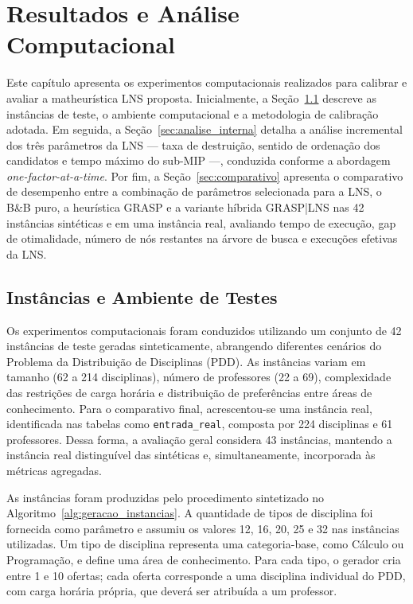 \chapter{Resultados e Análise Computacional} \label{ch:resultados}

Este capítulo apresenta os experimentos computacionais realizados para calibrar e avaliar a matheurística LNS proposta. Inicialmente, a Seção~\ref{sec:instancias} descreve as instâncias de teste, o ambiente computacional e a metodologia de calibração adotada. Em seguida, a Seção~\ref{sec:analise_interna} detalha a análise incremental dos três parâmetros da LNS --- taxa de destruição, sentido de ordenação dos candidatos e tempo máximo do sub-MIP ---, conduzida conforme a abordagem \emph{one-factor-at-a-time}. Por fim, a Seção~\ref{sec:comparativo} apresenta o comparativo de desempenho entre a combinação de parâmetros selecionada para a LNS, o B\&B puro, a heurística GRASP e a variante híbrida GRASP|LNS nas 42 instâncias sintéticas e em uma instância real, avaliando tempo de execução, gap de otimalidade, número de nós restantes na árvore de busca e execuções efetivas da LNS.

\section{Instâncias e Ambiente de Testes} \label{sec:instancias}

Os experimentos computacionais foram conduzidos utilizando um conjunto de 42 instâncias de teste geradas sinteticamente, abrangendo diferentes cenários do Problema da Distribuição de Disciplinas (PDD). As instâncias variam em tamanho (62 a 214 disciplinas), número de professores (22 a 69), complexidade das restrições de carga horária e distribuição de preferências entre áreas de conhecimento. Para o comparativo final, acrescentou-se uma instância real, identificada nas tabelas como \texttt{entrada\_real}, composta por 224 disciplinas e 61 professores. Dessa forma, a avaliação geral considera 43 instâncias, mantendo a instância real distinguível das sintéticas e, simultaneamente, incorporada às métricas agregadas.

As instâncias foram produzidas pelo procedimento sintetizado no Algoritmo~\ref{alg:geracao_instancias}. A quantidade de tipos de disciplina foi fornecida como parâmetro e assumiu os valores 12, 16, 20, 25 e 32 nas instâncias utilizadas. Um tipo de disciplina representa uma categoria-base, como Cálculo ou Programação, e define uma área de conhecimento. Para cada tipo, o gerador cria entre 1 e 10 ofertas; cada oferta corresponde a uma disciplina individual do PDD, com carga horária própria, que deverá ser atribuída a um professor.

